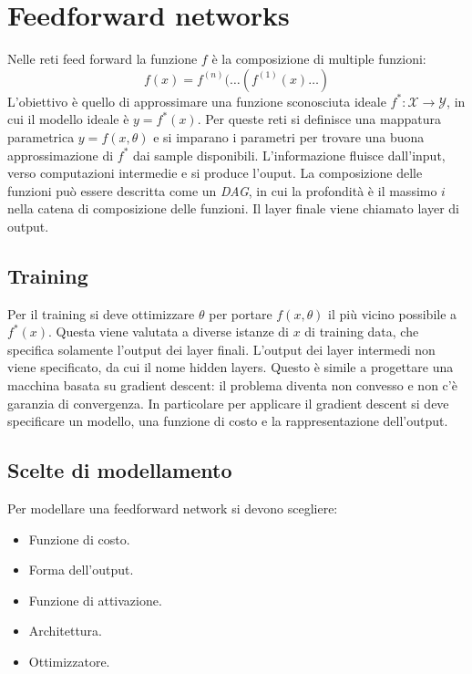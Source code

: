 \section{Feedforward networks}
Nelle reti feed forward la funzione $f$ \`e la composizione di multiple funzioni:
$$f(x) = f^{(n)}(\dots(f^{(1)}(x)\dots)$$
L'obiettivo \`e quello di approssimare una funzione sconosciuta ideale $f^*:\mathcal{X}\rightarrow\mathcal{Y}$, in cui il modello ideale \`e $y = f^*(x)$.
Per queste reti si definisce una mappatura parametrica $y = f(x,\theta)$ e si imparano i parametri per trovare una buona approssimazione di $f^*$ dai sample disponibili.
L'informazione fluisce dall'input, verso computazioni intermedie e si produce l'ouput.
La composizione delle funzioni pu\`o essere descritta come un \emph{DAG}, in cui la profondit\`a \`e il massimo $i$ nella catena di composizione delle funzioni.
Il layer finale viene chiamato layer di output.

	\subsection{Training}
	Per il training si deve ottimizzare $\theta$ per portare $f(x,\theta)$ il pi\`u vicino possibile a $f^*(x)$.
	Questa viene valutata a diverse istanze di $x$ di training data, che specifica solamente l'output dei layer finali.
	L'output dei layer intermedi non viene specificato, da cui il nome hidden layers.
	Questo \`e simile a progettare una macchina basata su gradient descent: il problema diventa non convesso e non c'\`e garanzia di convergenza.
	In particolare per applicare il gradient descent si deve specificare un modello, una funzione di costo e la rappresentazione dell'output.

	\subsection{Scelte di modellamento}
	Per modellare una feedforward network si devono scegliere:
	\begin{multicols}{2}
		\begin{itemize}
			\item Funzione di costo.
			\item Forma dell'output.
			\item Funzione di attivazione.
			\item Architettura.
			\item Ottimizzatore.
		\end{itemize}
	\end{multicols}

